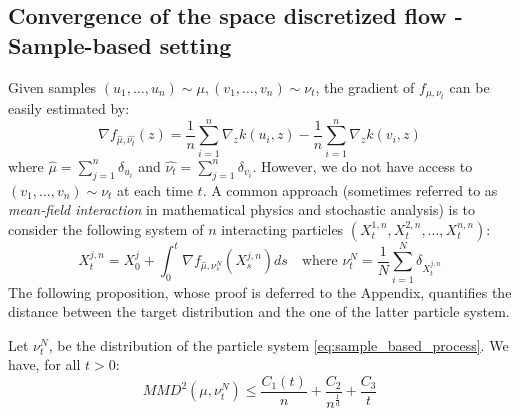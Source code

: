 \subsection{Convergence of the space discretized flow - Sample-based setting}

Given samples $(u_1, \dots, u_n)\sim \mu, (v_1, \dots, v_n)\sim \nu_t$, the gradient of $f_{\mu, \nu_t}$ can be easily estimated by:
\begin{equation}
\nabla f_{\widehat{\mu},\widehat{\nu_t}}(z)= \frac{1}{n}\sum_{i=1}^{n}\nabla_{z}k(u_i,z) -\frac{1}{n}\sum_{i=1}^{n}\nabla_{z}k(v_i,z) 
\end{equation}
where $\widehat{ \mu}=\sum_{j=1}^{n}\delta_{u_i}$ and $\widehat{ \nu_t}=\sum_{j=1}^{n}\delta_{v_i}$. However, we do not have access to $(v_1, \dots, v_n)\sim \nu_t$ at each time $t$. A common approach (sometimes referred to as \textit{mean-field interaction} in mathematical physics and stochastic analysis) is to consider the following system of $n$ interacting particles $(X_t^{1,n}, X_t^{2,n}, \dots, X_t^{n,n})$: \begin{equation}\label{eq:sample_based_process}
X_t^{j,n}=X_{0}^j+\int_{0}^t \nabla f_{\widehat{\mu}, \nu_s^N}(X_s^{j,n})ds \quad \text{where } \nu_t^N=\frac{1}{N} \sum_{i=1}^N \delta_{X_t^{j,n}}
\end{equation}
The following proposition, whose proof is deferred to the Appendix, quantifies the distance between the target distribution and the one of the latter particle system.
\begin{proposition}\label{prop:sample_based_rates}
	 Let $\nu_t^N$, be the distribution of the particle system \eqref{eq:sample_based_process}. We have, for all $t>0$:
	\begin{equation}
	MMD^2(\mu,\nu_t^N)\le \frac{C_1(t)}{n}+ \frac{C_2}{n^{\frac{1}{d}}} + \frac{C_3}{t}
	\end{equation}
\end{proposition}
